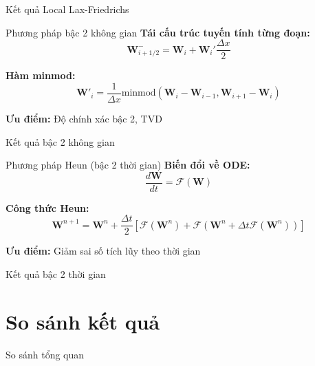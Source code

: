 \documentclass[aspectratio=169,22pt]{beamer}
\begin{document}
\begin{frame}{Kết quả Local Lax-Friedrichs}
\begin{center}
\scalebox{0.9}{}
\end{center}
\end{frame}

\begin{frame}{Phương pháp bậc 2 không gian}
\textbf{Tái cấu trúc tuyến tính từng đoạn:}
$$\mathbf{W}_{i+1/2}^- = \mathbf{W}_i + \mathbf{W}_i' \frac{\Delta x}{2}$$

\textbf{Hàm minmod:}
$$\mathbf{W}'_i = \frac{1}{\Delta x}\text{minmod}(\mathbf{W}_i - \mathbf{W}_{i-1}, \mathbf{W}_{i+1} - \mathbf{W}_i)$$

\textbf{Ưu điểm:} Độ chính xác bậc 2, TVD
\end{frame}

\begin{frame}{Kết quả bậc 2 không gian}
\begin{center}
\scalebox{0.9}{}
\end{center}
\end{frame}

\begin{frame}{Phương pháp Heun (bậc 2 thời gian)}
\textbf{Biến đổi về ODE:}
$$\frac{d\mathbf{W}}{dt} = \mathcal{F}(\mathbf{W})$$

\textbf{Công thức Heun:}
$$\mathbf{W}^{n+1} = \mathbf{W}^n + \frac{\Delta t}{2} \left[ \mathcal{F}(\mathbf{W}^n) + \mathcal{F}(\mathbf{W}^n + \Delta t \mathcal{F}(\mathbf{W}^n)) \right]$$

\textbf{Ưu điểm:} Giảm sai số tích lũy theo thời gian
\end{frame}

\begin{frame}{Kết quả bậc 2 thời gian}
\begin{center}
\scalebox{0.9}{}
\end{center}
\end{frame}

\section{So sánh kết quả}

\begin{frame}{So sánh tổng quan}
\begin{center}
\scalebox{1.0}{}
\end{center}
\end{frame}
\end{document}
